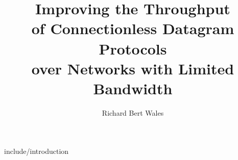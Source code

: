 \documentclass [PhD] {uclathes}
\title          {Improving the Throughput \\
	of Connectionless Datagram Protocols \\
	over Networks with Limited Bandwidth}
\author         {Richard Bert Wales}
\begin{document}
\makeintropages

%
%
 {include/introduction}                         



\end{document}
